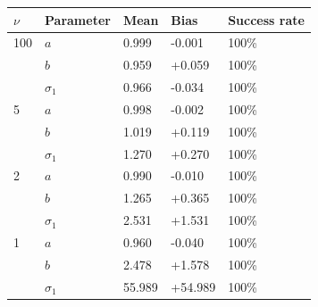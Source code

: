 \begin{tabular}{l l l l l}
\toprule
$\nu$ & Parameter & Mean & Bias & Success rate \\
\midrule
100 & $a$ & 0.999 & -0.001 & 100\% \\
 & $b$ & 0.959 & +0.059 & 100\% \\
 & $\sigma_1$ & 0.966 & -0.034 & 100\% \\
\midrule
5 & $a$ & 0.998 & -0.002 & 100\% \\
 & $b$ & 1.019 & +0.119 & 100\% \\
 & $\sigma_1$ & 1.270 & +0.270 & 100\% \\
\midrule
2 & $a$ & 0.990 & -0.010 & 100\% \\
 & $b$ & 1.265 & +0.365 & 100\% \\
 & $\sigma_1$ & 2.531 & +1.531 & 100\% \\
\midrule
1 & $a$ & 0.960 & -0.040 & 100\% \\
 & $b$ & 2.478 & +1.578 & 100\% \\
 & $\sigma_1$ & 55.989 & +54.989 & 100\% \\
\bottomrule
\end{tabular}